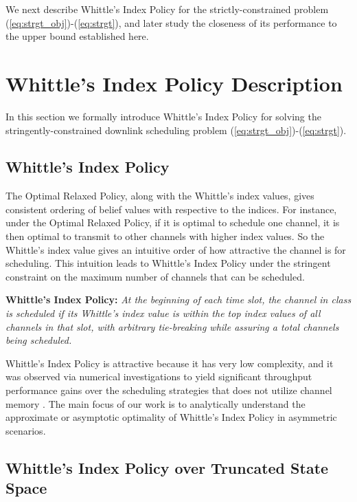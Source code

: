 \documentclass[11pt,twocolumn]{IEEEtran}
\begin{document}
We next describe Whittle's Index Policy for the strictly-constrained problem (\ref{eq:strgt_obj})-(\ref{eq:strgt}), and later study the closeness of its performance to the upper bound established here.



\section{Whittle's Index Policy Description}
\label{sec:num:index}

In this section we formally introduce Whittle's Index Policy for
solving the stringently-constrained downlink scheduling problem
(\ref{eq:strgt_obj})-(\ref{eq:strgt}).



\subsection{Whittle's Index Policy}
The Optimal Relaxed Policy, along with the Whittle's index values,
gives consistent ordering of belief values with respective to the
indices. For instance, under the Optimal Relaxed Policy, if it is
optimal to schedule one channel, it is then optimal to transmit to
other channels with higher index values. So the Whittle's index
value gives an intuitive order of how attractive the channel is for
scheduling. This intuition leads to Whittle's Index Policy
\cite{Zhao_index} under the stringent constraint on the maximum number of
channels that can be scheduled.

\vspace{3pt}
\noindent\textbf{Whittle's Index Policy:} \emph{At the beginning of each time slot, the channel  in class  is scheduled if its Whittle's index value  is within the top  index values of all channels in that slot, with arbitrary tie-breaking while assuring a total  channels being scheduled.}
\vspace{2pt}

Whittle's Index Policy is attractive because it has very low
complexity, and it was observed via numerical investigations to
yield significant throughput performance gains over the scheduling
strategies that does not utilize channel memory \cite{Infocom11}.
The main focus of our work is to analytically understand the approximate or asymptotic optimality of Whittle's Index Policy in asymmetric scenarios.

\subsection{Whittle's Index Policy over Truncated State Space}
\end{document}
